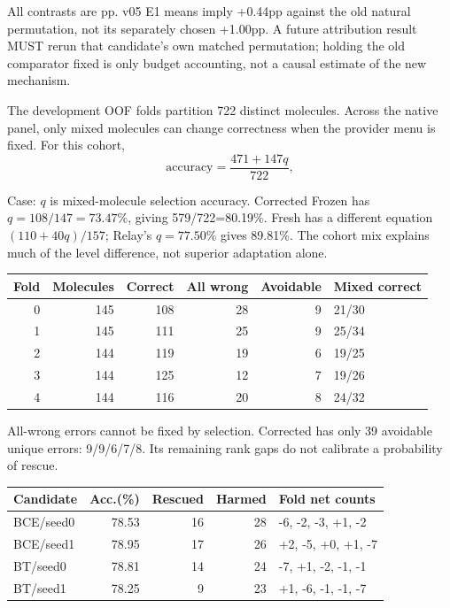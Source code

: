 \documentclass[10pt,letterpaper]{article}
\newcommand{\note}[1]{{\fontsize{8.5}{10.5}\selectfont #1\par}}
\newcommand{\sect}[1]{\vspace{5pt}{\large\bfseries #1}\par\vspace{2pt}}
\newenvironment{clean}{\begin{center}\fontsize{9.5}{11.5}\selectfont\setlength{\tabcolsep}{6pt}\renewcommand{\arraystretch}{1.06}}{\end{center}}
\begin{document}
\note{All contrasts are pp. v05 E1 means imply +0.44pp against the old natural permutation, not its separately chosen +1.00pp. A future attribution result MUST rerun that candidate's own matched permutation; holding the old comparator fixed is only budget accounting, not a causal estimate of the new mechanism.}
\newpage
\sect{E3 / body Table 5: cold-start errors, not just a mean}
The development OOF folds partition 722 distinct molecules. Across the native panel, only mixed molecules
can change correctness when the provider menu is fixed. For this cohort,
$$\text{accuracy}=\frac{471+147q}{722},$$
\note{Case: $q$ is mixed-molecule selection accuracy. Corrected Frozen has $q=108/147=73.47\%$,
giving 579/722=80.19\%. Fresh has a different equation $(110+40q)/157$; Relay's $q=77.50\%$
gives 89.81\%. The cohort mix explains much of the level difference, not superior adaptation alone.}
\par\noindent\begin{minipage}{\linewidth}\end{minipage}\par
\begin{clean}\begin{tabular}{@{}rrrrrl@{}}
\toprule
Fold & Molecules & Correct & All wrong & Avoidable & Mixed correct \\
\midrule
0 & 145 & 108 & 28 & 9 & 21/30 \\
1 & 145 & 111 & 25 & 9 & 25/34 \\
2 & 144 & 119 & 19 & 6 & 19/25 \\
3 & 144 & 125 & 12 & 7 & 19/26 \\
4 & 144 & 116 & 20 & 8 & 24/32 \\
\bottomrule\end{tabular}\end{clean}
\note{All-wrong errors cannot be fixed by selection. Corrected has only 39 avoidable unique errors: 9/9/6/7/8. Its remaining rank gaps do not calibrate a probability of rescue.}
\par\noindent\begin{minipage}{\linewidth}\end{minipage}\par
\begin{clean}\begin{tabular}{@{}lrrrl@{}}
\toprule
Candidate & Acc.(\%) & Rescued & Harmed & Fold net counts \\
\midrule
BCE/seed0 & 78.53 & 16 & 28 & -6, -2, -3, +1, -2 \\
BCE/seed1 & 78.95 & 17 & 26 & +2, -5, +0, +1, -7 \\
BT/seed0 & 78.81 & 14 & 24 & -7, +1, -2, -1, -1 \\
BT/seed1 & 78.25 & 9 & 23 & +1, -6, -1, -1, -7 \\
\bottomrule\end{tabular}\end{clean}
\end{document}
